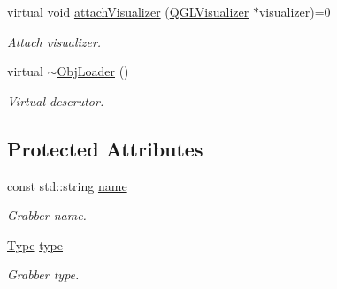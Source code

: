 \begin{DoxyCompactItemize}
\item 
virtual void \hyperlink{classputar_1_1ObjLoader_a55c7bdde6fcfb844112428477b1dca23}{attach\+Visualizer} (\hyperlink{classQGLVisualizer}{Q\+G\+L\+Visualizer} $\ast$visualizer)=0\hypertarget{classputar_1_1ObjLoader_a55c7bdde6fcfb844112428477b1dca23}{}\label{classputar_1_1ObjLoader_a55c7bdde6fcfb844112428477b1dca23}

\begin{DoxyCompactList}\small\item\em Attach visualizer. \end{DoxyCompactList}\item 
virtual \hyperlink{classputar_1_1ObjLoader_a28de419299127b7e00aa25183a74f138}{$\sim$\+Obj\+Loader} ()\hypertarget{classputar_1_1ObjLoader_a28de419299127b7e00aa25183a74f138}{}\label{classputar_1_1ObjLoader_a28de419299127b7e00aa25183a74f138}

\begin{DoxyCompactList}\small\item\em Virtual descrutor. \end{DoxyCompactList}\end{DoxyCompactItemize}
\subsection*{Protected Attributes}
\begin{DoxyCompactItemize}
\item 
const std\+::string \hyperlink{classputar_1_1ObjLoader_ae4e76e742af0ec90329f1953dc9a129a}{name}\hypertarget{classputar_1_1ObjLoader_ae4e76e742af0ec90329f1953dc9a129a}{}\label{classputar_1_1ObjLoader_ae4e76e742af0ec90329f1953dc9a129a}

\begin{DoxyCompactList}\small\item\em Grabber name. \end{DoxyCompactList}\item 
\hyperlink{classputar_1_1ObjLoader_a4891ad8bb46a1414e2e9f202c1552e09}{Type} \hyperlink{classputar_1_1ObjLoader_a591a39e2a5203d9b76d00c41b0877016}{type}\hypertarget{classputar_1_1ObjLoader_a591a39e2a5203d9b76d00c41b0877016}{}\label{classputar_1_1ObjLoader_a591a39e2a5203d9b76d00c41b0877016}

\begin{DoxyCompactList}\small\item\em Grabber type. \end{DoxyCompactList}\end{DoxyCompactItemize}


